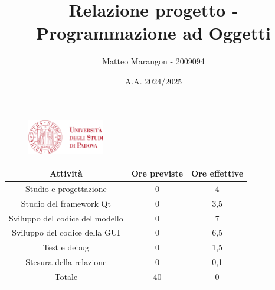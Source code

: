\documentclass[10pt]{article}
\title{Relazione progetto - Programmazione ad Oggetti}
\author{Matteo Marangon - 2009094}
\date{A.A. 2024/2025}
\begin{document}
\begin{figure}
    \centering
    \includegraphics[width=0.3\textwidth]{./unipdlogo.png}
\end{figure}
\maketitle

\newpage

\tableofcontents
\newpage

\begin{center}
    \begin{tabular}{| c | c | c |} \hline
    Attività & Ore previste & Ore effettive \\\hline
    Studio e progettazione & 0 & 4 \\
    Studio del framework Qt & 0 & 3,5 \\
    Sviluppo del codice del modello & 0 & 7 \\
    Sviluppo del codice della GUI & 0 & 6,5 \\
    Test e debug & 0 & 1,5 \\
    Stesura della relazione & 0 & 0,1 \\\hline
    Totale & 40 & 0 \\\hline
    \end{tabular}
\end{center}
\end{document}
